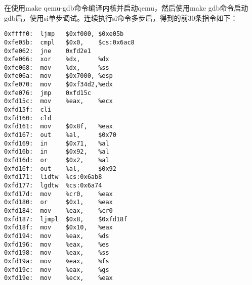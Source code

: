 
\begin{exerciseSolution}{2}
\par 在使用make qemu-gdb命令编译内核并启动qemu，然后使用make gdb命令启动gdb后，使用si单步调试。连续执行si命令多步后，得到的前30条指令如下：

\begin{lstlisting}
0xffff0:  ljmp   $0xf000, $0xe05b
0xfe05b:  cmpl   $0x0,    $cs:0x6ac8
0xfe062:  jne    0xfd2e1
0xfe066:  xor    %dx,     %dx
0xfe068:  mov    %dx,     %ss
0xfe06a:  mov    $0x7000, %esp
0xfe070:  mov    $0xf34d2,%edx
0xfe076:  jmp    0xfd15c
0xfd15c:  mov    %eax,    %ecx
0xfd15f:  cli
0xfd160:  cld
0xfd161:  mov    $0x8f,   %eax
0xfd167:  out    %al,     $0x70
0xfd169:  in     $0x71,   %al
0xfd16b:  in     $0x92,   %al
0xfd16d:  or     $0x2,    %al
0xfd16f:  out    %al,     $0x92
0xfd171:  lidtw  %cs:0x6ab8
0xfd177:  lgdtw  %cs:0x6a74
0xfd17d:  mov    %cr0,    %eax
0xfd180:  or     $0x1,    %eax
0xfd184:  mov    %eax,    %cr0
0xfd187:  ljmpl  $0x8,    $0xfd18f
0xfd18f:  mov    $0x10,   %eax
0xfd194:  mov    %eax,    %ds
0xfd196:  mov    %eax,    %es
0xfd198:  mov    %eax,    %ss
0xfd19a:  mov    %eax,    %fs
0xfd19c:  mov    %eax,    %gs
0xfd19e:  mov    %ecx,    %eax
\end{lstlisting}


\end{exerciseSolution}
